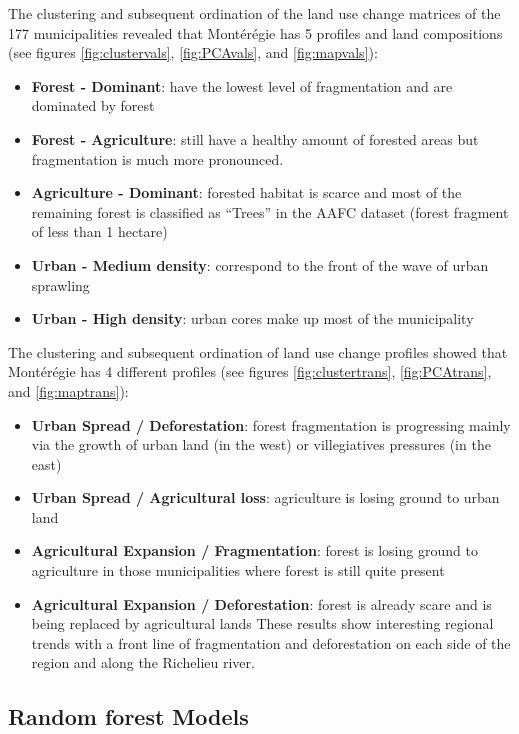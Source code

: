 The clustering and subsequent ordination of the land use change matrices of the 177 municipalities revealed that Montérégie has 5 profiles and land compositions (see figures \ref{fig:clustervals}, \ref{fig:PCAvals}, and \ref{fig:mapvals}):
\renewcommand{\labelitemi}{$\textendash$}
\begin{itemize}[leftmargin=0.5cm]
  \item \textbf{Forest - Dominant}: have the lowest level of fragmentation and are dominated by forest
  \item \textbf{Forest - Agriculture}: still have a healthy amount of forested areas but fragmentation is much more pronounced.
  \item \textbf{Agriculture - Dominant}: forested habitat is scarce and most of the remaining forest is classified as “Trees” in the AAFC dataset (forest fragment of less than 1 hectare)
  \item \textbf{Urban - Medium density}: correspond to the front of the wave of urban sprawling
  \item \textbf{Urban - High density}: urban cores make up most of the municipality
\end{itemize} 

The clustering and subsequent ordination of land use change profiles showed that Montérégie has 4 different profiles (see figures \ref{fig:clustertrans}, \ref{fig:PCAtrans}, and \ref{fig:maptrans}):
\begin{itemize}[leftmargin=0.5cm]
  \item \textbf{Urban Spread / Deforestation}: forest fragmentation is progressing mainly via the growth of urban land (in the west) or villegiatives pressures (in the east)
  \item \textbf{Urban Spread / Agricultural loss}: agriculture is losing ground to urban land
  \item \textbf{Agricultural Expansion / Fragmentation}: forest is losing ground to agriculture in those municipalities where forest is still quite present
  \item \textbf{Agricultural Expansion / Deforestation}: forest is already scare and is being replaced by agricultural lands
These results show interesting regional trends with a front line of fragmentation and deforestation on each side of the region and along the Richelieu river. \\ %
\end{itemize}

\subsection{Random forest Models}

